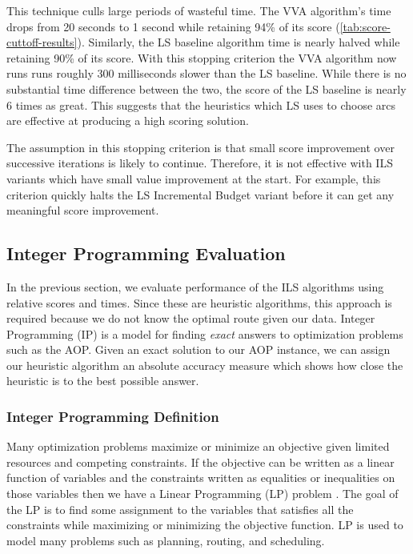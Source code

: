 \documentclass[honors]{union-cs-thesis}
\begin{document}
This technique culls large periods of wasteful time. The VVA algorithm's time drops from 20 seconds to 1 second while retaining 94\% of its score (\cref{tab:score-cuttoff-results}). Similarly, the LS baseline algorithm time is nearly halved while retaining 90\% of its score. With this stopping criterion the VVA algorithm now runs runs roughly 300 milliseconds slower than the LS baseline. While there is no substantial time difference between the two, the score of the LS baseline is nearly 6 times as great. This suggests that the heuristics which LS uses to choose arcs are effective at producing a high scoring solution.

The assumption in this stopping criterion is that small score improvement over successive iterations is likely to continue. Therefore, it is not effective with ILS variants which have small value improvement at the start. For example, this criterion quickly halts the LS Incremental Budget variant before it can get any meaningful score improvement. 


\subsection{Integer Programming Evaluation}
\label{sec:int-programming}
In the previous section, we evaluate performance of the ILS algorithms using relative scores and times. Since these are heuristic algorithms, this approach is required because we do not know the optimal route given our data. Integer Programming (IP) is a model for finding \emph{exact} answers to optimization problems such as the AOP. Given an exact solution to our AOP instance, we can assign our heuristic algorithm an absolute accuracy measure which shows how close the heuristic is to the best possible answer.

\subsubsection{Integer Programming Definition}
Many optimization problems maximize or minimize an objective given limited resources and competing constraints. If the objective can be written as a linear function of variables and the constraints written as equalities or inequalities on those variables then we have a Linear Programming (LP) problem \cite{clrs}. The goal of the LP is to find some assignment to the variables that satisfies all the constraints while maximizing or minimizing the objective function. LP is used to model many problems such as planning, routing, and scheduling.
\end{document}
